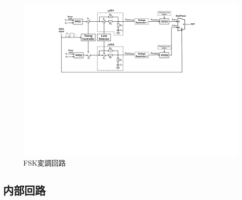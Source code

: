 \begin{figure}[h]
\begin{center}

\includegraphics[width=160mm]{figures/fskmodulator.pdf}
\caption{FSK変調回路}
\label{fskmodulator}
\end{center}

\end{figure}

\subsection{内部回路}
